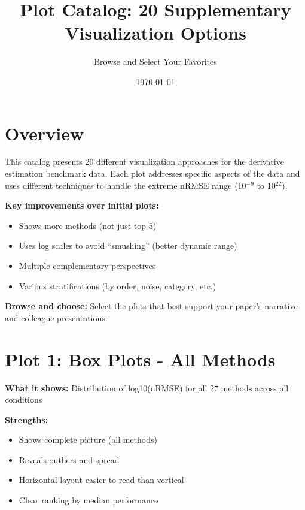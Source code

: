 \documentclass[11pt]{article}
\title{Plot Catalog: 20 Supplementary Visualization Options}
\author{Browse and Select Your Favorites}
\date{\today}
\begin{document}
\maketitle

\section*{Overview}

This catalog presents 20 different visualization approaches for the derivative estimation benchmark data. Each plot addresses specific aspects of the data and uses different techniques to handle the extreme nRMSE range (10$^{-9}$ to 10$^{22}$).

\textbf{Key improvements over initial plots:}
\begin{itemize}
    \item Shows more methods (not just top 5)
    \item Uses log scales to avoid ``smushing'' (better dynamic range)
    \item Multiple complementary perspectives
    \item Various stratifications (by order, noise, category, etc.)
\end{itemize}

\textbf{Browse and choose:} Select the plots that best support your paper's narrative and colleague presentations.

\clearpage


\section*{Plot 1: Box Plots - All Methods}

\textbf{What it shows:} Distribution of log10(nRMSE) for all 27 methods across all conditions

\textbf{Strengths:}
\begin{itemize}
    \item Shows complete picture (all methods)
    \item Reveals outliers and spread
    \item Horizontal layout easier to read than vertical
    \item Clear ranking by median performance
\end{itemize}
\end{document}
